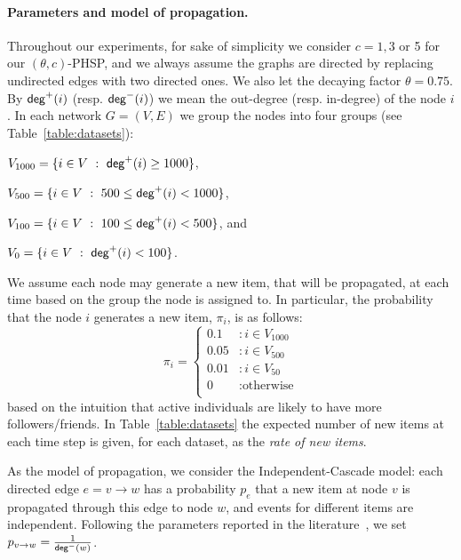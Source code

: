 \paragraph{\bf Parameters and model of propagation.}
Throughout our experiments, for sake of simplicity we consider $c=1,3$ or 5 for our $(\theta,c)$-PHSP, and we always assume the graphs are directed by replacing undirected edges with two directed ones. We also let the decaying factor $\theta = 0.75$. By $\mathsf{deg}^+(i)$ (resp. $\mathsf{deg}^-(i)$) we mean the out-degree (resp. in-degree) of the node $i$. In each network $G=(V,E)$ we group the nodes into four groups (see Table~\ref{table:datasets}):
\begin{itemize*}
 \item $V_{1000} = \{i\in V ~:~ \mathsf{deg}^+(i) \geq 1000\}$,
 \item $V_{500}  = \{i\in V ~:~ 500\leq \mathsf{deg}^+(i) < 1000\}$,
 \item $V_{100}  = \{i\in V ~:~ 100\leq \mathsf{deg}^+(i) < 500\}$, and
 \item $V_{0}    = \{i\in V ~:~ \mathsf{deg}^+(i) < 100\}$.
\end{itemize*}
We assume each node may generate a new item, that will be propagated, at each time based on the group the node is assigned to. In particular, the probability that the node $i$ generates a new item, $\pi_i$, is as follows:
$$
   \pi_i = \left\{
     \begin{array}{ll}
       0.1 &: i \in V_{1000}\\
       0.05 &: i \in V_{500} \\       
       0.01 &: i \in V_{50} \\
       0 & : \text{otherwise} \\
     \end{array}
   \right.
$$
based on the intuition that active individuals are  likely to have more followers/friends. In Table~\ref{table:datasets} the expected number of new items at each time step is given, for each dataset, as the \emph{rate of new items}.



As the model of propagation, we consider the Independent-Cascade model\cite{Kempe2003}:  each directed edge $e=v\rightarrow w$ has a probability $p_e$ that a new item at node $v$ is propagated through this edge to node $w$, and events for different items are independent. Following the parameters reported in the literature~\cite{Kempe2003,Chen2009,Chen2010,jung2011irie,tang2014influence}, we set $p_{v\rightarrow w} = \frac{1}{\mathsf{deg}^-(w)}$.



